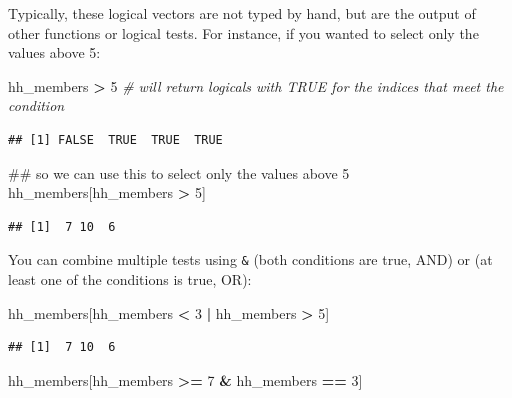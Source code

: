\documentclass[]{book}
\newenvironment{Shaded}{\begin{snugshade}}{\end{snugshade}}
\newcommand{\DecValTok}[1]{\textcolor[rgb]{0.00,0.00,0.81}{#1}}
\newcommand{\StringTok}[1]{\textcolor[rgb]{0.31,0.60,0.02}{#1}}
\newcommand{\CommentTok}[1]{\textcolor[rgb]{0.56,0.35,0.01}{\textit{#1}}}
\newcommand{\OperatorTok}[1]{\textcolor[rgb]{0.81,0.36,0.00}{\textbf{#1}}}
\newcommand{\NormalTok}[1]{#1}
\begin{document}
Typically, these logical vectors are not typed by hand, but are the
output of other functions or logical tests. For instance, if you wanted
to select only the values above 5:

\begin{Shaded}
\begin{Highlighting}[]
\NormalTok{hh_members }\OperatorTok{>}\StringTok{ }\DecValTok{5}    \CommentTok{# will return logicals with TRUE for the indices that meet the condition}
\end{Highlighting}
\end{Shaded}

\begin{verbatim}
## [1] FALSE  TRUE  TRUE  TRUE
\end{verbatim}

\begin{Shaded}
\begin{Highlighting}[]
\NormalTok{## so we can use this to select only the values above 5}
\NormalTok{hh_members[hh_members }\OperatorTok{>}\StringTok{ }\DecValTok{5}\NormalTok{]}
\end{Highlighting}
\end{Shaded}

\begin{verbatim}
## [1]  7 10  6
\end{verbatim}

You can combine multiple tests using \texttt{\&} (both conditions are
true, AND) or \texttt{\textbar{}} (at least one of the conditions is
true, OR):

\begin{Shaded}
\begin{Highlighting}[]
\NormalTok{hh_members[hh_members }\OperatorTok{<}\StringTok{ }\DecValTok{3} \OperatorTok{|}\StringTok{ }\NormalTok{hh_members }\OperatorTok{>}\StringTok{ }\DecValTok{5}\NormalTok{]}
\end{Highlighting}
\end{Shaded}

\begin{verbatim}
## [1]  7 10  6
\end{verbatim}

\begin{Shaded}
\begin{Highlighting}[]
\NormalTok{hh_members[hh_members }\OperatorTok{>=}\StringTok{ }\DecValTok{7} \OperatorTok{&}\StringTok{ }\NormalTok{hh_members }\OperatorTok{==}\StringTok{ }\DecValTok{3}\NormalTok{]}
\end{Highlighting}
\end{Shaded}
\end{document}
